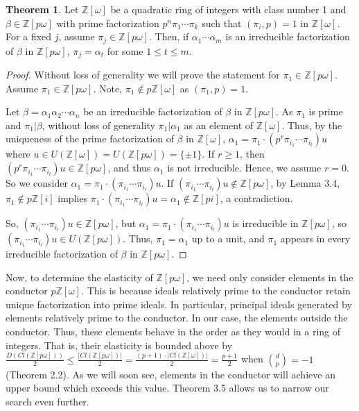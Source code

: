 \documentclass{amsart}
\theoremstyle{definition}
\newtheorem{thm}[lem]{Theorem}
\newcommand{\bbz}{\mathbb{Z}}
\renewcommand{\geq}{\geqslant}
\renewcommand{\leq}{\leqslant}
\numberwithin{equation}{section}
\begin{document}
\begin{thm}
    Let $\bbz[\omega]$ be a quadratic ring of integers with class number 1 and $\beta \in \bbz[p\omega]$ with prime factorization $p^n\pi_1 \dotsm \pi_k$ such that $(\pi_i,p) = 1$ in $\bbz[\omega]$. For a fixed $j$, assume $\pi_j \in \bbz[p\omega]$. Then, if $\alpha_1 \dotsm \alpha_m$ is an irreducible factorization of $\beta$ in $\bbz[p\omega]$, $\pi_j = \alpha_t$ for some  $1 \leq t \leq m$. 
    \end{thm}

\begin{proof}
    Without loss of generality we will prove the statement for $\pi_1 \in \bbz[p\omega]$. Assume $\pi_1 \in \bbz[p\omega]$. Note, $\pi_1 \notin p\bbz[\omega]$ as $(\pi_1,p) = 1$.

    Let $\beta = \alpha_1 \alpha_2 \dotsm \alpha_n$ be an irreducible factorization of $\beta$ in $\bbz[p\omega]$. As $\pi_1$ is prime and $\pi_1 | \beta$,  without loss of generality $\pi_1 | \alpha_1$ as an element of $\bbz[\omega]$. Thus, by the uniqueness of the prime factorization of $\beta$ in $\bbz[\omega]$, $\alpha_1 = \pi_1\cdot (p^r\pi_{i_1} \dotsm \pi_{i_l})u$  where $u \in U(\bbz[\omega]) = U(\bbz[p\omega])=\{\pm1\}$. If $r \geq 1$, then $(p^r \pi_{i_1} \dotsm \pi_{i_l})u \in \bbz[p\omega]$, and thus $\alpha_1$ is not irreducible. Hence, we assume $r = 0$. So we consider $\alpha_1 = \pi_1\cdot (\pi_{i_1} \dotsm \pi_{i_l})u$. If $(\pi_{i_1} \dotsm \pi_{i_l})u \notin \bbz[p\omega]$, by Lemma 3.4, $\pi_1 \notin p\bbz[i]$ implies $\pi_1 \cdot (\pi_{i_1} \dotsm \pi_{i_l})u = \alpha_1 \notin \bbz[pi]$, a contradiction. 
    
    So, $(\pi_{i_1} \dotsm \pi_{i_l})u \in \bbz[p\omega]$, but $\alpha_1 = \pi_1\cdot (\pi_{i_1} \dotsm \pi_{i_l})u$ is irreducible in $\bbz[p\omega]$, so $(\pi_{i_1} \dotsm \pi_{i_l})u \in U(\bbz[p\omega])$. Thus, $\pi_1 = \alpha_1$ up to a unit, and $\pi_1$ appears in every irreducible factorization of $\beta$ in $\bbz[p\omega]$. 
\end{proof}

Now, to determine the elasticity of $\bbz[p\omega]$, we need only consider elements in the conductor $p\bbz[\omega]$. This is because ideals relatively prime to the conductor retain unique factorization into prime ideals. In particular, principal ideals generated by elements relatively prime to the conductor. In our case, the elements outside the conductor. Thus, these elements behave in the order as they would in a ring of integers. That is, their elasticity is bounded above by $\frac{D(Cl(\bbz[p\omega]))}{2} \leq \frac{|Cl(\bbz[p\omega])|}{2} = \frac{(p+1)\cdot|Cl(\bbz[\omega])|}{2} = \frac{p+1}{2}$ when $\binom{d}{p}=-1$ (Theorem 2.2). As we will soon see, elements in the conductor will achieve an upper bound which exceeds this value. Theorem 3.5 allows us to narrow our search even further.
\end{document}
